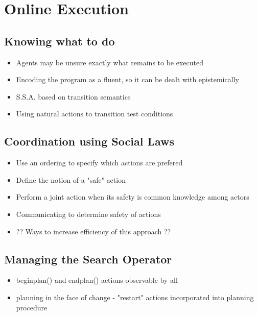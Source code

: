 \chapter{Online Execution}\label{ch:online-exec}

\section{Knowing what to do}
\begin{itemize}
\item Agents may be unsure exactly what remains to be executed
\item Encoding the program as a fluent, so it can be dealt with epistemically
\item S.S.A. based on transition semantics
\item Using natural actions to transition test conditions
\end{itemize}

\section{Coordination using Social Laws}
\begin{itemize}
\item Use an ordering to specify which actions are prefered
\item Define the notion of a "safe" action
\item Perform a joint action when its safety is common knowledge among actors
\item Communicating to determine safety of actions
\item ?? Ways to increase efficiency of this approach ??
\end{itemize}

\section{Managing the Search Operator}
\begin{itemize}
\item beginplan() and endplan() actions observable by all
\item planning in the face of change - "restart" actions incorporated into planning procedure
\end{itemize}

